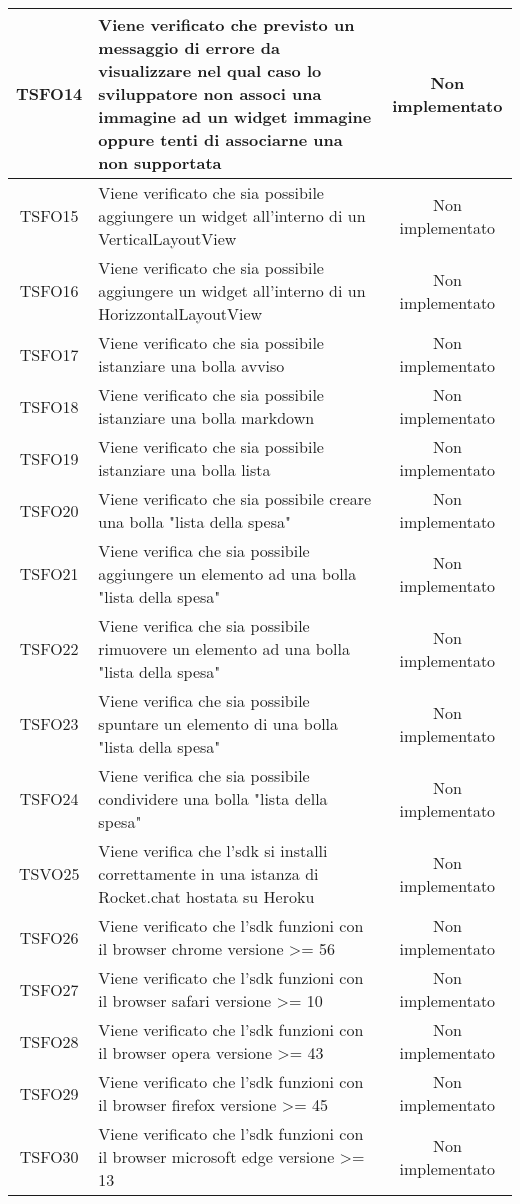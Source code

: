 \begin{center}
\begin{longtable}{|c|>{\centering}m{10cm}|c|}
		TSFO14 & Viene verificato che previsto un messaggio di errore da visualizzare nel qual caso lo sviluppatore non associ una immagine ad un widget immagine oppure tenti di associarne una non supportata & Non implementato \\ \hline
		TSFO15 & Viene verificato che sia possibile aggiungere un widget all'interno di un VerticalLayoutView & Non implementato \\ \hline
		TSFO16 & Viene verificato che sia possibile aggiungere un widget all'interno di un HorizzontalLayoutView & Non implementato \\ \hline
		TSFO17 & Viene verificato che sia possibile istanziare una bolla avviso & Non implementato \\ \hline
		TSFO18 & Viene verificato che sia possibile istanziare una bolla markdown & Non implementato \\ \hline
		TSFO19 & Viene verificato che sia possibile istanziare una bolla lista & Non implementato \\ \hline
		TSFO20 & Viene verificato che sia possibile creare una bolla "lista della spesa" & Non implementato \\ \hline
		TSFO21 & Viene verifica che sia possibile aggiungere un elemento ad una bolla "lista della spesa" & Non implementato \\ \hline
		TSFO22 & Viene verifica che sia possibile rimuovere un elemento ad una bolla "lista della spesa" & Non implementato \\ \hline
		TSFO23 & Viene verifica che sia possibile spuntare un elemento di una bolla "lista della spesa" & Non implementato \\ \hline
		TSFO24 & Viene verifica che sia possibile condividere una bolla "lista della spesa" & Non implementato \\ \hline
		TSVO25 & Viene verifica che l'sdk si installi correttamente in una istanza di Rocket.chat hostata su Heroku & Non implementato \\ \hline
		TSFO26 & Viene verificato che l'sdk funzioni con il browser chrome versione >= 56 & Non implementato \\ \hline
		TSFO27 & Viene verificato che l'sdk funzioni con il browser safari versione >= 10 & Non implementato \\ \hline
		TSFO28 & Viene verificato che l'sdk funzioni con il browser opera versione >= 43 & Non implementato \\ \hline
		TSFO29 & Viene verificato che l'sdk funzioni con il browser firefox versione >= 45 & Non implementato \\ \hline
		TSFO30 & Viene verificato che l'sdk funzioni con il browser microsoft edge versione >= 13 & Non implementato \\ \hline
	\end{longtable}
\end{center}
